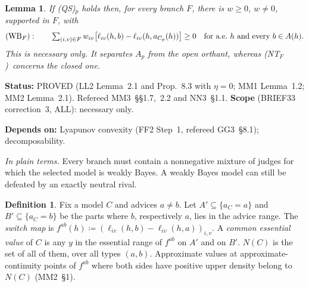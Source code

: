 \documentclass[11pt]{article}
\newtheorem{lemma}[theorem]{Lemma}
\theoremstyle{definition}
\newtheorem{definition}[theorem]{Definition}
\theoremstyle{remark}
\newcommand{\src}[1]{\textsf{#1}}
\newcommand{\status}[1]{\par\smallskip\noindent\textbf{Status:} #1\par}
\newcommand{\deps}[1]{\noindent\textbf{Depends on:} #1\par}
\newcommand{\inwords}[1]{\noindent\textit{In plain terms.} #1\par\smallskip}
\newcommand{\QS}{\textup{(QS)}}
\newcommand{\NT}{\textup{(NT$_F$)}}
\newcommand{\WB}{\textup{(WB$_F$)}}
\begin{document}
\begin{lemma}\label{lem:weakbayes}
If \QS$_p$ holds then, for every branch $F$, there is $w\ge0$, $w\ne0$, supported in $F$, with
\[
\WB:\qquad\textstyle\sum_{(i,v)\in F}w_{iv}\bigl[\ell_{iv}(h,b)-\ell_{iv}(h,a_{C_p}(h))\bigr]\ge0\quad\text{for a.e.\ }h\text{ and every }b\in A(h).
\]
This is \emph{necessary only}. It separates $A_p$ from the \emph{open} orthant, whereas \NT\ concerns the closed one.
\end{lemma}
\status{PROVED (\src{LL2} Lemma~2.1 and Prop.~8.3 with $\eta=0$; \src{MM1} Lemma~1.2; \src{MM2} Lemma~2.1). Refereed \src{MM3}~\S\S1.7,~2.2 and \src{NN3}~\S1.1. \textbf{Scope} (\src{BRIEF33} correction~3, \src{ALL}): necessary only.}
\deps{Lyapunov convexity (FF2 Step~1, refereed GG3~\S8.1); decomposability.}
\inwords{Every branch must contain a nonnegative mixture of judges for which the selected model is weakly Bayes. A weakly Bayes model can still be defeated by an exactly neutral rival.}

\begin{definition}\label{def:cev}
Fix a model $C$ and advices $a\ne b$. Let $A'\subseteq\{a_C=a\}$ and $B'\subseteq\{a_C=b\}$ be the parts where $b$, respectively $a$, lies in the advice range. The \emph{switch map} is $f^{ab}(h)\coloneqq(\ell_{iv}(h,b)-\ell_{iv}(h,a))_{i,v}$. A \emph{common essential value} of $C$ is any $y$ in the essential range of $f^{ab}$ on $A'$ and on $B'$. $N(C)$ is the set of all of them, over all types $(a,b)$. Approximate values at approximate-continuity points of $f^{ab}$ where both sides have positive upper density belong to $N(C)$ (\src{MM2}~\S1).
\end{definition}
\end{document}
